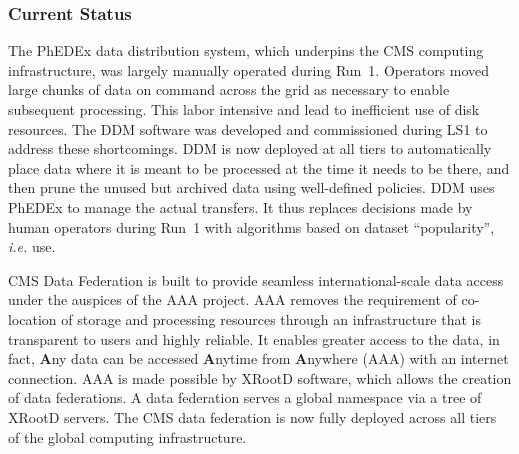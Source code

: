 \documentclass[11pt,a4paper]{article}
\begin{document}

\subsubsection{Current Status}

The PhEDEx data distribution system, which underpins the CMS computing
infrastructure, was largely manually operated during Run~1.    Operators
moved large chunks of data on command across the grid as necessary to
enable subsequent processing.  This labor intensive and lead to inefficient use
of disk resources.
The DDM software was developed and commissioned during LS1 to address these
shortcomings. DDM is now deployed at all tiers to automatically place data
where it is meant to be processed at the time it needs to be there, and
then prune the unused but archived data using well-defined policies.  
%
DDM uses PhEDEx to manage the actual transfers. It thus replaces decisions
made by human operators during Run~1 with algorithms based on dataset
``popularity'', {\it i.e.} use.

CMS Data Federation is built to provide seamless international-scale data
access under the auspices of the AAA project. AAA removes the requirement
of co-location of storage and processing resources through an
infrastructure that is transparent to users and highly reliable.  It
enables greater access to the data, 
in fact, {\bf A}ny data can be accessed {\bf A}nytime from {\bf A}nywhere (AAA) with an
internet connection. 
AAA is made possible by XRootD software, which allows the creation of
data federations. A data federation serves a global namespace via a
tree of XRootD servers. 
The CMS data federation is now fully deployed across all tiers of the global
computing infrastructure. 
\end{document}
